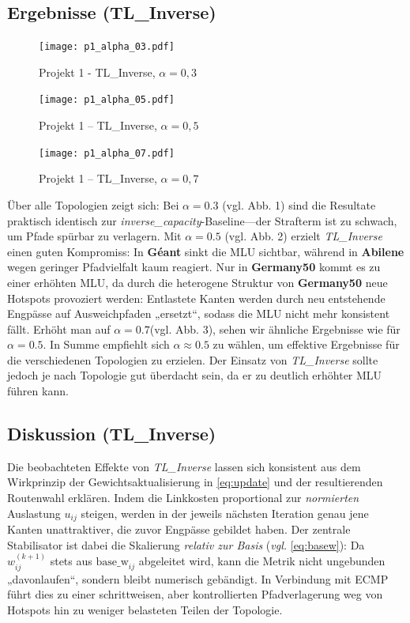 \documentclass[sigconf,nonacm,review]{acmart}
\begin{document}
\subsection{Ergebnisse (TL\_Inverse)}
\begin{figure}[H]
  \centering
  \texttt{[image: p1\_alpha\_03.pdf]}
  \caption{Projekt 1 -  TL\_Inverse, $\alpha=0{,}3$}
  \label{fig:p1-a03}
\end{figure}
\begin{figure}[H]
  \centering
  \texttt{[image: p1\_alpha\_05.pdf]}
  \caption{Projekt 1 – TL\_Inverse, $\alpha=0{,}5$}
  \label{fig:p1-a05}
\end{figure}
\begin{figure}[H]
  \centering
  \texttt{[image: p1\_alpha\_07.pdf]}
  \caption{Projekt 1 – TL\_Inverse, $\alpha=0{,}7$}
  \label{fig:p1-a07}
\end{figure}
\FloatBarrier
\noindent 
Über alle Topologien zeigt sich: Bei \(\alpha=0.3\) (vgl. Abb. 1) sind die Resultate praktisch
identisch zur \emph{inverse\_capacity}-Baseline—der Strafterm ist zu schwach, um Pfade spürbar zu verlagern.
Mit \(\alpha=0.5\) (vgl. Abb. 2) erzielt \textit{TL\_Inverse} einen guten Kompromiss: In \textbf{Géant} sinkt die MLU sichtbar, während in \textbf{Abilene} wegen geringer Pfadvielfalt kaum reagiert. Nur in \textbf{Germany50} kommt es zu einer erhöhten MLU, da durch die heterogene Struktur von \textbf{Germany50} neue Hotspots provoziert werden: Entlastete Kanten werden durch neu entstehende Engpässe auf Ausweichpfaden „ersetzt“, sodass die MLU nicht mehr konsistent fällt.
Erhöht man auf \(\alpha=0.7\)(vgl. Abb. 3), sehen wir ähnliche Ergebnisse wie für \(\alpha=0.5\).
 In Summe empfiehlt sich \(\alpha\approx0.5\) zu wählen, um effektive Ergebnisse für die verschiedenen Topologien zu erzielen. Der Einsatz von \textit{TL\_Inverse} sollte jedoch je nach Topologie gut überdacht sein, da er zu deutlich erhöhter MLU führen kann.

\subsection{Diskussion (TL\_Inverse)}
Die beobachteten Effekte von \textit{TL\_Inverse} lassen sich konsistent aus dem Wirkprinzip der Gewichtsaktualisierung in \eqref{eq:update} und der resultierenden Routenwahl erklären. Indem die Linkkosten proportional zur \emph{normierten} Auslastung $u_{ij}$ steigen, werden in der jeweils nächsten Iteration genau jene Kanten unattraktiver, die zuvor Engpässe gebildet haben. Der zentrale Stabilisator ist dabei die Skalierung \emph{relativ zur Basis} (\emph{vgl.} \eqref{eq:basew}): Da $w^{(k+1)}_{ij}$ stets aus $\mathrm{base\_w}_{ij}$ abgeleitet wird, kann die Metrik nicht ungebunden „davonlaufen“, sondern bleibt numerisch gebändigt. In Verbindung mit ECMP führt dies zu einer schrittweisen, aber kontrollierten Pfadverlagerung weg von Hotspots hin zu weniger belasteten Teilen der Topologie.
\end{document}
